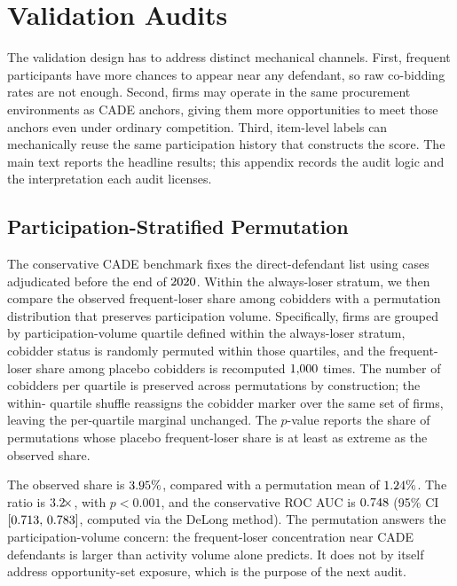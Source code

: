 \section{Validation Audits}
\label{app:validation_audits_submission}

The validation design has to address distinct mechanical
channels. First, frequent participants have more chances to
appear near any defendant, so raw co-bidding rates are not
enough. Second, firms may operate in the same procurement
environments as CADE anchors, giving them more opportunities to
meet those anchors even under ordinary competition. Third,
item-level labels can mechanically reuse the same participation
history that constructs the score. The main text reports the
headline results; this appendix records the audit logic and the
interpretation each audit licenses.

\subsection{Participation-Stratified Permutation}
\label{app:permutation_submission}

The conservative CADE benchmark fixes the direct-defendant list
using cases adjudicated before the end of
$2020$. Within the always-loser stratum, we
then compare the observed frequent-loser share among cobidders
with a permutation distribution that preserves participation
volume. Specifically, firms are grouped by participation-volume
quartile defined within the always-loser stratum, cobidder
status is randomly permuted within those quartiles, and the
frequent-loser share among placebo cobidders is recomputed
$1{,}000$ times. The number of cobidders per quartile is
preserved across permutations by construction; the within-
quartile shuffle reassigns the cobidder marker over the same
set of firms, leaving the per-quartile marginal unchanged. The
$p$-value reports the share of permutations whose placebo
frequent-loser share is at least as extreme as the observed
share.

The observed share is $3.95\%$, compared with a
permutation mean of $1.24\%$. The ratio is
$3.2\!\times$, with $p<0.001$, and the conservative
ROC AUC is $0.748$ (95\% CI $[0.713,\,0.783]$,
computed via the DeLong method). The permutation answers the
participation-volume concern: the frequent-loser concentration
near CADE defendants is larger than activity volume alone
predicts. It does not by itself address opportunity-set
exposure, which is the purpose of the next audit.

